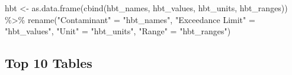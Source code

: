\documentclass[12pt, twoside]{amherstthesis}
\newenvironment{Shaded}{\begin{snugshade}}{\end{snugshade}}
\newcommand{\FunctionTok}[1]{\textcolor[rgb]{0.00,0.00,0.00}{#1}}
\newcommand{\NormalTok}[1]{#1}
\newcommand{\OtherTok}[1]{\textcolor[rgb]{0.56,0.35,0.01}{#1}}
\newcommand{\SpecialCharTok}[1]{\textcolor[rgb]{0.00,0.00,0.00}{#1}}
\newcommand{\StringTok}[1]{\textcolor[rgb]{0.31,0.60,0.02}{#1}}
\begin{document}
\begin{Shaded}
\begin{Highlighting}[]
\NormalTok{hbt }\OtherTok{\textless{}{-}} \FunctionTok{as.data.frame}\NormalTok{(}\FunctionTok{cbind}\NormalTok{(hbt\_names, hbt\_values, hbt\_units, }
\NormalTok{                           hbt\_ranges)) }\SpecialCharTok{\%\textgreater{}\%}
  \FunctionTok{rename}\NormalTok{(}\StringTok{"Contaminant"} \OtherTok{=} \StringTok{"hbt\_names"}\NormalTok{,}
         \StringTok{"Exceedance Limit"} \OtherTok{=} \StringTok{"hbt\_values"}\NormalTok{,}
         \StringTok{"Unit"} \OtherTok{=} \StringTok{"hbt\_units"}\NormalTok{,}
         \StringTok{"Range"} \OtherTok{=} \StringTok{"hbt\_ranges"}\NormalTok{) }
\end{Highlighting}
\end{Shaded}
\hypertarget{top-10-tables}{%
\subsection{Top 10 Tables}\label{top-10-tables}}
\end{document}
